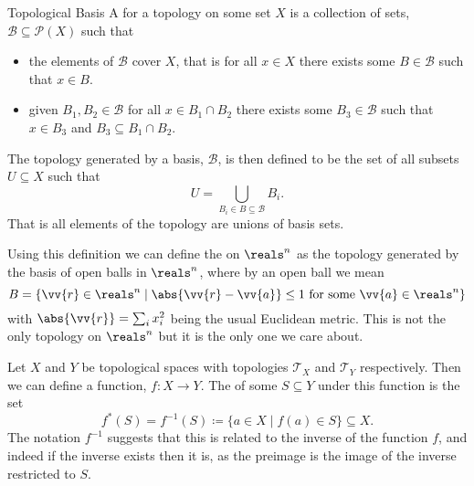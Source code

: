 \begin{dfn}{Topological Basis}{}
    A  for a topology on some set \(X\) is a collection of sets, \(\mathcal{B} \subseteq \mathcal{P}(X)\) such that
    \begin{itemize}
        \item the elements of \(\mathcal{B}\) cover \(X\), that is for all \(x \in X\) there exists some \(B \in \mathcal{B}\) such that \(x \in B\).
        \item given \(B_1, B_2 \in \mathcal{B}\) for all \(x \in B_1 \cap B_2\) there exists some \(B_3 \in \mathcal{B}\) such that \(x \in B_3\) and \(B_3 \subseteq B_1 \cap B_2\).
    \end{itemize}
    The topology generated by a basis, \(\mathcal{B}\), is then defined to be the set of all subsets \(U \subseteq X\) such that\vspace{-0.5ex}
    \begin{equation}
        U = \bigcup_{B_i \in B \subseteq \mathcal{B}} B_i.
    \end{equation}\vspace{-0.5ex}
    That is all elements of the topology are unions of basis sets.
\end{dfn}

Using this definition we can define the  on \(\reals^n\) as the topology generated by the basis of open balls in \(\reals^n\), where by an open ball we mean
\begin{equation}
    B = \{\vv{r} \in \reals^n \mid \abs{\vv{r} - \vv{a}} \le 1 \text{ for some } \vv{a} \in \reals^n\}
\end{equation}
with \(\abs{\vv{r}} = \sum_i x_i^2\) being the usual Euclidean metric.
This is not the only topology on \(\reals^n\) but it is the only one we care about.

Let \(X\) and \(Y\) be topological spaces with topologies \(\mathcal{T}_X\) and \(\mathcal{T}_Y\) respectively.
Then we can define a function, \(f \colon X \to Y\).
The  of some \(S \subseteq Y\) under this function is the set
\begin{equation}
    f^*(S) = f^{-1}(S) \coloneqq \{a \in X \mid f(a) \in S\} \subseteq X.
\end{equation}
The notation \(f^{-1}\) suggests that this is related to the inverse of the function \(f\), and indeed if the inverse exists then it is, as the preimage is the image of the inverse restricted to \(S\).

